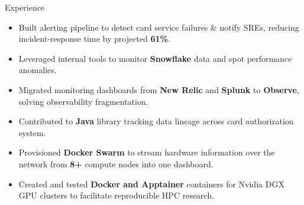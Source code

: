 \documentclass{resume} %
\begin{document}
\begin{workSection}{Experience}
	
	\experienceItem[
	company=Capital One,
	location=McLean{,} VA,
	position=Software Engineering Intern,
	duration= June 2025 - present,
	]
	\begin{itemize}
		\vspace{-0.5em}
		\itemsep -6pt {}
		\item Built alerting pipeline to detect card service failures \& notify SREs, reducing incident-response time by projected \textbf{61\%}.
		\item Leveraged internal tools to monitor \textbf{Snowflake} data and spot performance anomalies.
		\item Migrated monitoring dashboards from \textbf{New Relic} and \textbf{Splunk} to \textbf{Observe}, solving observability fragmentation.
		\item Contributed to \textbf{Java} library tracking data lineage across card authorization system.
	\end{itemize}
	
	\experienceItem[
	company=UTEP,
	location=El Paso{,} TX,
	position=Undergraduate Research Assistant,
	duration= January 2025 - May 2025,
	]
	\begin{itemize}
		\vspace{-0.5em}
		\itemsep -6pt {}
		\item Provisioned \textbf{Docker Swarm} 
		to stream hardware information 
		over the network
		from \textbf{8+} compute nodes into one dashboard.
		\item Created and tested \textbf{Docker and Apptainer} containers for Nvidia DGX GPU clusters to facilitate reproducible HPC research.
	\end{itemize}
	

\end{workSection}
\end{document}
